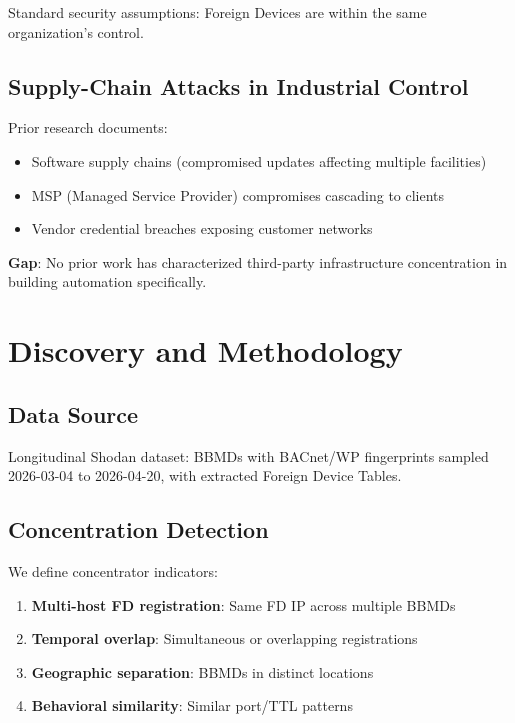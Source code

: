 \documentclass[11pt,a4paper]{article}
\begin{document}
Standard security assumptions: Foreign Devices are within the same 
organization's control.

\subsection{Supply-Chain Attacks in Industrial Control}

Prior research documents:
\begin{itemize}
  \item Software supply chains (compromised updates affecting multiple facilities)
  \item MSP (Managed Service Provider) compromises cascading to clients
  \item Vendor credential breaches exposing customer networks
\end{itemize}

\textbf{Gap}: No prior work has characterized third-party infrastructure 
concentration in building automation specifically.

\section{Discovery and Methodology}
\label{sec:methodology}

\subsection{Data Source}

Longitudinal Shodan dataset: BBMDs with BACnet/WP fingerprints sampled 
2026-03-04 to 2026-04-20, with extracted Foreign Device Tables.

\subsection{Concentration Detection}

We define concentrator indicators:

\begin{enumerate}
  \item \textbf{Multi-host FD registration}: Same FD IP across multiple BBMDs
  \item \textbf{Temporal overlap}: Simultaneous or overlapping registrations
  \item \textbf{Geographic separation}: BBMDs in distinct locations
  \item \textbf{Behavioral similarity}: Similar port/TTL patterns
\end{enumerate}
\end{document}
